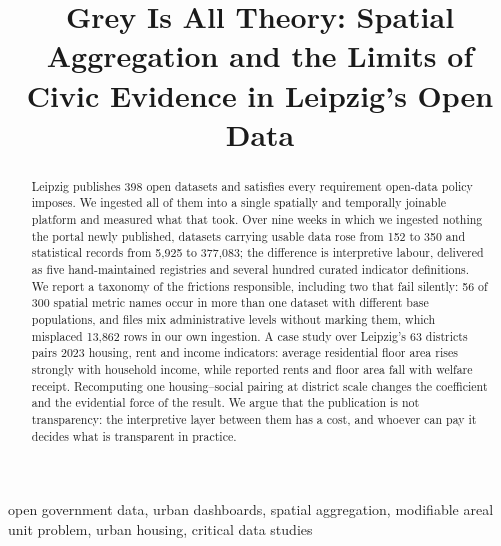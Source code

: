 \documentclass[conference,a4paper]{IEEEtran}
\begin{document}
\title{Grey Is All Theory: Spatial Aggregation and the Limits of Civic
Evidence in Leipzig's Open Data}

\author{
\and
{}
}

\maketitle
\thispagestyle{fancy}
\pagestyle{fancy}
\fancyhf{}
\fancyfoot[C]{\thepage}
\renewcommand{\headrulewidth}{0pt}

\begin{abstract}
Leipzig publishes 398 open datasets and satisfies every requirement open-data
policy imposes. We ingested all of them into a single spatially and temporally
joinable platform and measured what that took. Over nine weeks in which we
ingested nothing the portal newly published, datasets carrying usable data rose
from 152 to 350 and statistical records from 5{,}925 to 377{,}083; the
difference is interpretive labour, delivered as five hand-maintained registries
and several hundred curated indicator definitions. We report a taxonomy of the
frictions responsible, including two that fail silently: 56 of 300 spatial metric names
occur in more than one dataset with different base populations, and files mix
administrative levels without marking them, which misplaced 13{,}862 rows in our
own ingestion. A case study over Leipzig's 63 districts pairs 2023 housing,
rent and income indicators: average residential floor area rises strongly with
household income, while reported rents and floor area fall with welfare receipt.
Recomputing one housing--social pairing at district scale changes the coefficient
and the evidential force of the result. We argue
that the publication is not transparency: the interpretive layer between them has a
cost, and whoever can pay it decides what is transparent in practice.
\end{abstract}

\begin{IEEEkeywords}
open government data, urban dashboards, spatial aggregation, modifiable areal
unit problem, urban housing, critical data studies
\end{IEEEkeywords}
\end{document}
